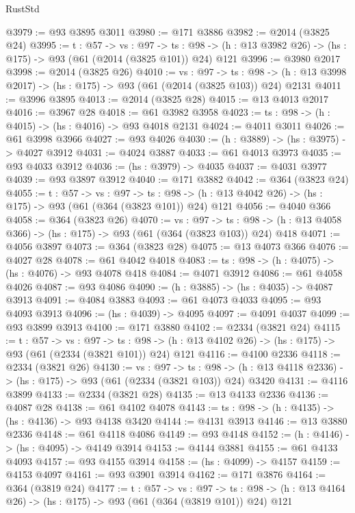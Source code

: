 \begin{lexlean}{RustStd}
\begin{coremodule}
@3979 := @93 @3895 @3011
@3980 := @171 @3886
@3982 := @2014 (@3825 @24)
@3995 := {t : @57} ->
  {vs : @97} ->
  {ts : @98} -> (h : @13 @3982 @26) -> (hs : @175) -> @93 (@61 (@2014 (@3825 @101)) @24) @121
@3996 := @3980 @2017
@3998 := @2014 (@3825 @26)
@4010 := {vs : @97} ->
  {ts : @98} -> (h : @13 @3998 @2017) -> (hs : @175) -> @93 (@61 (@2014 (@3825 @103)) @24) @2131
@4011 := @3996 @3895
@4013 := @2014 (@3825 @28)
@4015 := @13 @4013 @2017
@4016 := @3967 @28
@4018 := @61 @3982 @3958
@4023 := {ts : @98} -> (h : @4015) -> (hs : @4016) -> @93 @4018 @2131
@4024 := @4011 @3011
@4026 := @61 @3998 @3966
@4027 := @93 @4026
@4030 := (h : @3889) -> (hs : @3975) -> @4027 @3912
@4031 := @4024 @3887
@4033 := @61 @4013 @3973
@4035 := @93 @4033 @3912
@4036 := (hs : @3979) -> @4035
@4037 := @4031 @3977
@4039 := @93 @3897 @3912
@4040 := @171 @3882
@4042 := @364 (@3823 @24)
@4055 := {t : @57} ->
  {vs : @97} ->
  {ts : @98} -> (h : @13 @4042 @26) -> (hs : @175) -> @93 (@61 (@364 (@3823 @101)) @24) @121
@4056 := @4040 @366
@4058 := @364 (@3823 @26)
@4070 := {vs : @97} ->
  {ts : @98} -> (h : @13 @4058 @366) -> (hs : @175) -> @93 (@61 (@364 (@3823 @103)) @24) @418
@4071 := @4056 @3897
@4073 := @364 (@3823 @28)
@4075 := @13 @4073 @366
@4076 := @4027 @28
@4078 := @61 @4042 @4018
@4083 := {ts : @98} -> (h : @4075) -> (hs : @4076) -> @93 @4078 @418
@4084 := @4071 @3912
@4086 := @61 @4058 @4026
@4087 := @93 @4086
@4090 := (h : @3885) -> (hs : @4035) -> @4087 @3913
@4091 := @4084 @3883
@4093 := @61 @4073 @4033
@4095 := @93 @4093 @3913
@4096 := (hs : @4039) -> @4095
@4097 := @4091 @4037
@4099 := @93 @3899 @3913
@4100 := @171 @3880
@4102 := @2334 (@3821 @24)
@4115 := {t : @57} ->
  {vs : @97} ->
  {ts : @98} -> (h : @13 @4102 @26) -> (hs : @175) -> @93 (@61 (@2334 (@3821 @101)) @24) @121
@4116 := @4100 @2336
@4118 := @2334 (@3821 @26)
@4130 := {vs : @97} ->
  {ts : @98} -> (h : @13 @4118 @2336) -> (hs : @175) -> @93 (@61 (@2334 (@3821 @103)) @24) @3420
@4131 := @4116 @3899
@4133 := @2334 (@3821 @28)
@4135 := @13 @4133 @2336
@4136 := @4087 @28
@4138 := @61 @4102 @4078
@4143 := {ts : @98} -> (h : @4135) -> (hs : @4136) -> @93 @4138 @3420
@4144 := @4131 @3913
@4146 := @13 @3880 @2336
@4148 := @61 @4118 @4086
@4149 := @93 @4148
@4152 := (h : @4146) -> (hs : @4095) -> @4149 @3914
@4153 := @4144 @3881
@4155 := @61 @4133 @4093
@4157 := @93 @4155 @3914
@4158 := (hs : @4099) -> @4157
@4159 := @4153 @4097
@4161 := @93 @3901 @3914
@4162 := @171 @3876
@4164 := @364 (@3819 @24)
@4177 := {t : @57} ->
  {vs : @97} ->
  {ts : @98} -> (h : @13 @4164 @26) -> (hs : @175) -> @93 (@61 (@364 (@3819 @101)) @24) @121

\end{coremodule}
\end{lexlean}
